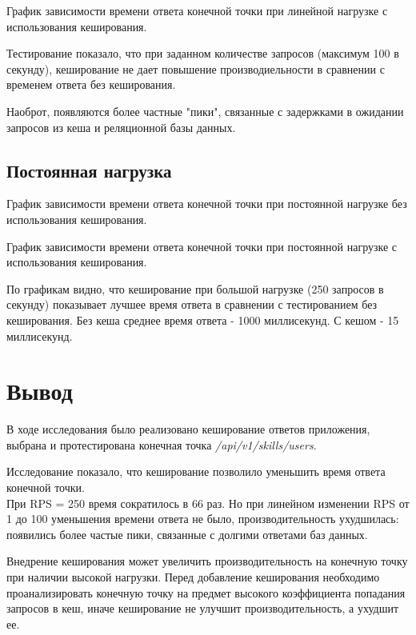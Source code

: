 \newpage

График зависимости времени ответа конечной точки при линейной нагрузке с использования кеширования.   

Тестирование показало, что при заданном количестве запросов (максимум 100 в секунду), кеширование не дает повышение производиельности в сравнении с временем ответа без кеширования. 
 
Наоброт, появляются более частные "пики", связанные с задержками в ожидании запросов из кеша и реляционной базы данных.  

\newpage
\subsection{Постоянная нагрузка}

График зависимости времени ответа конечной точки при постоянной нагрузке без использования кеширования.   
\newpage

График зависимости времени ответа конечной точки при постоянной нагрузке с использования кеширования.   

По графикам видно, что кеширование при большой нагрузке (250 запросов в секунду) показывает лучшее время ответа в сравнении с тестированием без кеширования. 
Без кеша среднее время ответа - 1000 миллисекунд.  
С кешом - 15 миллисекунд.  

\newpage

\section*{Вывод}

В ходе исследования было реализовано кеширование ответов приложения, выбрана и протестирована конечная точка \textit{/api/v1/skills/users}.

Исследование показало, что кеширование позволило уменьшить время ответа конечной точки.\\
При RPS = 250 время сократилось в 66 раз. Но при линейном изменении RPS от 1 до 100 уменьшения времени ответа не было, производительность ухудшилась: появились более частые пики, связанные с долгими ответами баз данных.  

Внедрение кеширования может увеличить производительность на конечную точку при наличии высокой нагрузки.  
Перед добавление кеширования необходимо проанализировать конечную точку на предмет высокого коэффициента попадания запросов в кеш, иначе кеширование не улучшит производительность, а ухудшит ее.  
